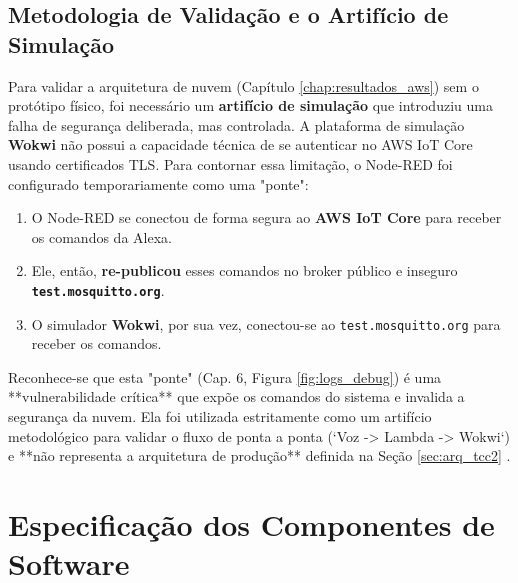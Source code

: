 \subsection{Metodologia de Validação e o Artifício de Simulação}
Para validar a arquitetura de nuvem (Capítulo \ref{chap:resultados_aws}) sem o protótipo físico, foi necessário um \textbf{artifício de simulação} que introduziu uma falha de segurança deliberada, mas controlada.
A plataforma de simulação \textbf{Wokwi} não possui a capacidade técnica de se autenticar no AWS IoT Core usando certificados TLS.
Para contornar essa limitação, o Node-RED foi configurado temporariamente como uma "ponte":
\begin{enumerate}
    \item O Node-RED se conectou de forma segura ao \textbf{AWS IoT Core} para receber os comandos da Alexa.
\item Ele, então, \textbf{re-publicou} esses comandos no broker público e inseguro \textbf{\texttt{test.mosquitto.org}}.
\item O simulador \textbf{Wokwi}, por sua vez, conectou-se ao \texttt{test.mosquitto.org} para receber os comandos.
\end{enumerate}

Reconhece-se que esta "ponte" (Cap. 6, Figura \ref{fig:logs_debug}) é uma **vulnerabilidade crítica** que expõe os comandos do sistema e invalida a segurança da nuvem.
Ela foi utilizada estritamente como um artifício metodológico para validar o fluxo de ponta a ponta (`Voz -> Lambda -> Wokwi`) e **não representa a arquitetura de produção** definida na Seção \ref{sec:arq_tcc2} \cite{aws_iot_core_docs, aws_lambda_docs}.

\section{Especificação dos Componentes de Software}


